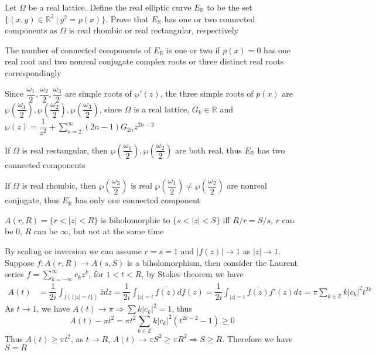 \documentclass[main]{subfiles}
\begin{document}
\begin{exercise}
Let $\Omega$ be a real lattice. Define the real elliptic curve $E_{\mathbb R}$ to be the set $\{(x,y)\in\mathbb R^2 \ |\ y^2=
p(x)\}$. Prove that $E_{\mathbb R}$ has one or two connected components as $\Omega$ is real rhombic or real rectangular, respectively
\end{exercise}

\begin{solution}
The number of connected components of $E_\mathbb{R}$ is one or two if $p(x)=0$ has one real root and two nonreal conjugate complex roots or three distinct real roots correspondingly \par
Since $\dfrac{\omega_1}{2},\dfrac{\omega_2}{2},\dfrac{\omega_3}{2}$ are simple roots of $\wp'(z)$, the three simple roots of $p(x)$ are $\wp\left(\dfrac{\omega_1}{2}\right),\wp\left(\dfrac{\omega_2}{2}\right),\wp\left(\dfrac{\omega_3}{2}\right)$, since $\Omega$ is a real lattice, $G_k\in\mathbb{R}$ and $\wp(z)=\dfrac{1}{z^2}+\sum_{n=2}^{\infty}(2n-1)G_{2n}z^{2n-2}$ \par
If $\Omega$ is real rectangular, then $\wp\left(\dfrac{\omega_1}{2}\right),\wp\left(\dfrac{\omega_2}{2}\right)$ are both real, thus $E_\mathbb{R}$ has two connected components \par
If $\Omega$ is real rhombic, then $\wp\left(\dfrac{\omega_3}{2}\right)$ is real $\wp\left(\dfrac{\omega_1}{2}\right)\neq\wp\left(\dfrac{\omega_2}{2}\right)$ are nonreal conjugate, thus $E_\mathbb{R}$ has only one connected component
\end{solution}

\begin{exercise}\label{Complex structures on an open annulus}
$A(r,R)=\{r<|z|<R\}$ is biholomorphic to $\{s<|z|<S\}$ iff $R/r=S/s$, $r$ can be $0$, $R$ can be $\infty$, but not at the same time
\end{exercise}

\begin{solution}
By scaling or inversion we can assume $r=s=1$ and $|f(z)|\to1$ as $|z|\to1$. Suppose $f:A(r,R)\to A(s,S)$ is a biholomorphism, then consider the Laurent series $f=\displaystyle\sum_{k=-\infty}^{\infty}c_kz^k$, for $1<t<R$, by Stokes theorem we have
\begin{align*}
A(t)&=\dfrac{1}{2i}\int_{f(\{|z|=t\})}\bar zdz=\dfrac{1}{2i}\int_{|z|=t}\overline{f(z)}df(z)=\dfrac{1}{2i}\int_{|z|=t}\overline{f(z)}f'(z)dz=\pi\sum_{k\in\mathbb Z}k|c_k|^2t^{2k}
\end{align*}
As $t\to1$, we have $A(t)\to\pi\Rightarrow\sum k|c_k|^2=1$, thus
\[A(t)-\pi t^2=\pi t^2\sum_{k\in\mathbb Z}k|c_k|^2\left(t^{2k-2}-1\right)\geq0\]
Thus $A(t)\geq\pi t^2$, as $t\to R$, $A(t)\to\pi S^2\geq\pi R^2\Rightarrow S\geq R$. Therefore we have $S=R$
\end{solution}
\end{document}
